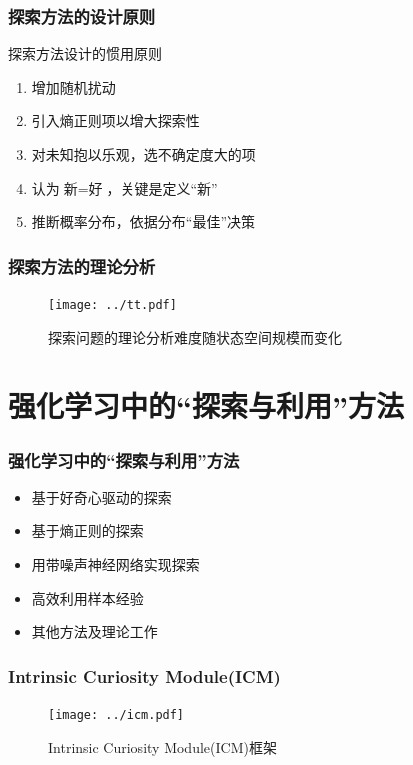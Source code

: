\documentclass{beamer}
\begin{document}
\begin{CJK*}{GBK}{hei}
\begin{frame}\frametitle{探索方法的设计原则}
探索方法设计的惯用原则\citep{Levinecs294}\citep{weng2020exploration}
\begin{enumerate}
\item 增加随机扰动
\item 引入熵正则项以增大探索性
\item 对未知抱以乐观，选不确定度大的项
\item 认为$\text{新}=\text{好}$，关键是定义“新”
\item 推断概率分布，依据分布“最佳”决策
\end{enumerate}
\end{frame}

\begin{frame}\frametitle{探索方法的理论分析}
    \begin{figure}[htbp]
        \centering\texttt{[image: ../tt.pdf]}
        \caption{探索问题的理论分析难度随状态空间规模而变化\citep{Levinecs294}}
    \end{figure}
\end{frame}

\section{强化学习中的“探索与利用”方法}
\begin{frame}\frametitle{强化学习中的“探索与利用”方法}
\begin{itemize}
\item 基于好奇心驱动的探索
\item 基于熵正则的探索
\item 用带噪声神经网络实现探索
\item 高效利用样本经验
\item 其他方法及理论工作
\end{itemize}
\end{frame}

\begin{frame}\frametitle{Intrinsic Curiosity Module(ICM)}
        \begin{figure}[htbp]
            \centering\texttt{[image: ../icm.pdf]}
	       \caption{Intrinsic Curiosity Module(ICM)框架\citep{Pathak2017CuriosityDrivenEB}}
        \end{figure}
\end{frame}


\end{CJK*}
\end{document}
